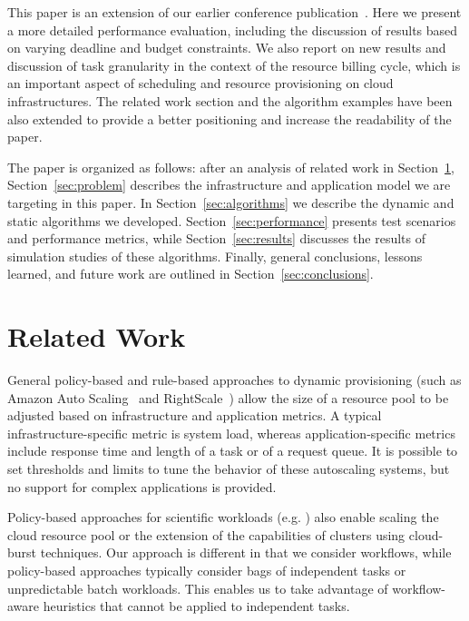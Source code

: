 \documentclass[preprint,5p]{elsarticle}
\begin{document}
This paper is an extension of our earlier conference
publication~\cite{Malawski-SC12}.
Here we present a more detailed performance evaluation, including the discussion
of results based on varying deadline and budget constraints. We also report on new
results and discussion of task granularity in the context of the resource
billing cycle, which is an important aspect of scheduling and resource provisioning
on cloud infrastructures. The related work section and the algorithm examples
have been also extended to provide a better positioning and increase the readability of the paper.


The paper is organized as follows: after an analysis of related work in
Section~\ref{sec:related}, Section~\ref{sec:problem} describes the
infrastructure and application model we are targeting in this paper. In
Section~\ref{sec:algorithms} we describe the dynamic and static algorithms we
developed. Section~\ref{sec:performance} presents test scenarios and performance
metrics, while Section~\ref{sec:results} discusses the results of simulation
studies of these algorithms. Finally, general conclusions, lessons learned, and
future work are outlined in Section~\ref{sec:conclusions}.


\section{Related Work}
\label{sec:related}
General policy-based and rule-based approaches to dynamic provisioning (such as Amazon
Auto Scaling~\cite{Autoscaling} and
RightScale~\cite{RightScale}) allow the size
of a resource pool to be adjusted based on infrastructure and
application metrics. A typical infrastruc\-ture-specific metric is system load,
whereas application-speci\-fic metrics include response time and length of a task or
of a request queue. It is possible to set thresholds and limits to tune the behavior
of these autoscaling systems, but no support for complex applications is provided.


Policy-based approaches for scientific workloads (e.g. \cite{Marshall2010,
Kim2011,Chen2011}) also enable scaling the cloud resource pool or the extension of the
capabilities of clusters using cloud-burst techniques. Our approach is different
in that we consider workflows, while policy-based approaches typically consider
bags of independent tasks or unpredictable batch workloads. This enables us to
take advantage of workflow-aware heuristics that cannot be applied to
independent tasks.
\end{document}
